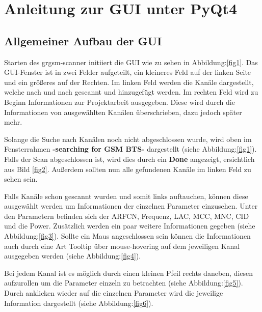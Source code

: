
\chapter{Anleitung zur GUI unter PyQt4}

\section{Allgemeiner Aufbau der GUI}

Starten des grgsm-scanner initiiert die GUI wie zu sehen in Abbildung:\ref{fig1}.
Das GUI-Fenster ist in zwei Felder aufgeteilt, ein kleineres Feld auf der linken Seite
und ein größeres auf der Rechten.
Im linken Feld werden die Kanäle dargestellt, welche nach und nach gescannt und hinzugefügt werden.
Im rechten Feld wird zu Beginn Informationen zur Projektarbeit ausgegeben. Diese wird durch die Informationen von ausgewählten Kanälen überschrieben, dazu jedoch später mehr.


\noindent Solange die Suche nach Kanälen noch nicht abgeschlossen wurde, wird oben im Fensterrahmen \textbf{-searching for GSM BTS-} dargestellt (siehe Abbildung:\ref{fig1}).
Falls der Scan abgeschlossen ist, wird dies durch ein \textbf{Done} angezeigt, ersichtlich aus Bild \ref{fig2}. Außerdem sollten nun alle gefundenen Kanäle im linken Feld zu sehen sein.



\noindent Falls Kanäle schon gescannt wurden und somit links auftauchen, können diese ausgewählt werden um Informationen der einzelnen Parameter einzusehen.
Unter den Parametern befinden sich der ARFCN, Frequenz, LAC, MCC, MNC, CID und die Power.
Zusätzlich werden ein paar weitere Informationen gegeben (siehe Abbildung:\ref{fig3}).
Sollte ein Maus angeschlossen sein können die Informationen auch durch eine Art Tooltip über mouse-hovering auf dem jeweiligen Kanal ausgegeben werden (siehe Abbildung:\ref{fig4}).




\noindent Bei jedem Kanal ist es möglich durch einen kleinen Pfeil rechts daneben, diesen aufzurollen um die Parameter einzeln zu betrachten (siehe Abbildung:\ref{fig5}). Durch anklicken wieder auf die einzelnen Parameter wird die jeweilige Information dargestellt (siehe Abbildung:\ref{fig6}).

